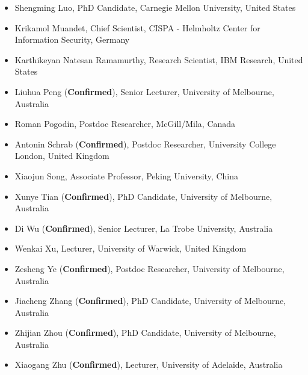 \documentclass{article}
\newcommand{\confirmed}{\textcolor{green!60!black}{\textbf{Confirmed}}}
\begin{document}
\begin{itemize}[leftmargin=10pt,nosep]
\item Shengming Luo, PhD Candidate, Carnegie Mellon University, United States
\item Krikamol Muandet, Chief Scientist, CISPA - Helmholtz Center for Information Security, Germany
\item Karthikeyan Natesan Ramamurthy, Research Scientist, IBM Research, United States
\item Liuhua Peng (\confirmed), Senior Lecturer, University of Melbourne, Australia
\item Roman Pogodin, Postdoc Researcher, McGill/Mila, Canada
\item Antonin Schrab (\confirmed), Postdoc Researcher, University College London, United Kingdom
\item Xiaojun Song, Associate Professor, Peking University, China
\item Xunye Tian (\confirmed), PhD Candidate, University of Melbourne, Australia
\item Di Wu (\confirmed), Senior Lecturer, La Trobe University, Australia
\item Wenkai Xu, Lecturer, University of Warwick, United Kingdom
\item Zesheng Ye (\confirmed), Postdoc Researcher, University of Melbourne, Australia
\item Jiacheng Zhang (\confirmed), PhD Candidate, University of Melbourne, Australia
\item Zhijian Zhou (\confirmed), PhD Candidate, University of Melbourne, Australia
\item Xiaogang Zhu (\confirmed), Lecturer, University of Adelaide, Australia

\end{itemize}


\newpage



\end{document}
